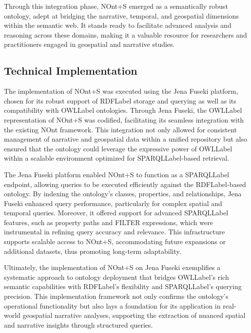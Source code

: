 Through this integration phase, NOnt+S emerged as a semantically robust ontology, adept at bridging the narrative, temporal, and geospatial dimensions within the semantic web. It stands ready to facilitate advanced analysis and reasoning across these domains, making it a valuable resource for researchers and practitioners engaged in geospatial and narrative studies.


\subsection{Technical Implementation}\label{IV-subsec:technical-implementation}

The implementation of NOnt+S was executed using the Jena Fuseki platform\cite{ApacheJenaFuseki}, chosen for its robust support of \acrshort{RDFLabel} storage and querying as well as its compatibility with \acrshort{OWLLabel} ontologies. Through Jena Fuseki, the \acrshort{OWLLabel} representation of NOnt+S was codified, facilitating its seamless integration with the existing NOnt framework. This integration not only allowed for consistent management of narrative and geospatial data within a unified repository but also ensured that the ontology could leverage the expressive power of \acrshort{OWLLabel} within a scalable environment optimized for \acrshort{SPARQLLabel}-based retrieval.

The Jena Fuseki platform enabled NOnt+S to function as a \acrshort{SPARQLLabel} endpoint, allowing queries to be executed efficiently against the \acrshort{RDFLabel}-based ontology. By indexing the ontology’s classes, properties, and relationships, Jena Fuseki enhanced query performance, particularly for complex spatial and temporal queries. Moreover, it offered support for advanced \acrshort{SPARQLLabel} features, such as property paths and FILTER expressions, which were instrumental in refining query accuracy and relevance. This infrastructure supports scalable access to NOnt+S, accommodating future expansions or additional datasets, thus promoting long-term adaptability.

Ultimately, the implementation of NOnt+S on Jena Fuseki exemplifies a systematic approach to ontology deployment that bridges \acrshort{OWLLabel}’s rich semantic capabilities with \acrshort{RDFLabel}’s flexibility and \acrshort{SPARQLLabel}’s querying precision. This implementation framework not only confirms the ontology’s operational functionality but also lays a foundation for its application in real-world geospatial narrative analyses, supporting the extraction of nuanced spatial and narrative insights through structured queries.


